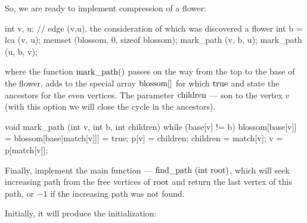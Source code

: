 
So, we are ready to implement compression of a flower:

\code
int v, u; // edge (v,u), the consideration of which was discovered a flower
int b = lca (v, u);
memset (blossom, 0, sizeof blossom);
mark_path (v, b, u);
mark_path (u, b, v);
\endcode

where the function $\rm mark\_path()$ passes on the way from the top to the base of the flower, adds to the special array $\rm blossom[]$ for which $\rm true$ and state the ancestors for the even vertices. The parameter $\rm children$ --- son to the vertex $v$ (with this option we will close the cycle in the ancestors).

\code
void mark_path (int v, int b, int children) {
while (base[v] != b) {
blossom[base[v]] = blossom[base[match[v]]] = true;
p[v] = children;
children = match[v];
v = p[match[v]];
}
}
\endcode

Finally, implement the main function --- $\rm find\_path ~ (int ~ root)$, which will seek increasing path from the free vertices of $\rm root$ and return the last vertex of this path, or $-1$ if the increasing path was not found.

Initially, it will produce the initialization:

